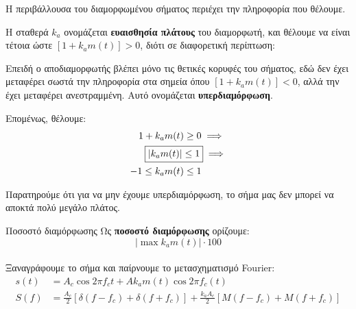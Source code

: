 \documentclass[11pt,a4paper,notitlepage,fleqn,final]{article}
\begin{document}
Η περιβάλλουσα του διαμορφωμένου σήματος περιέχει την πληροφορία που θέλουμε.

Η σταθερά \( k_a \) ονομάζεται \textbf{ευαισθησία πλάτους} του διαμορφωτή, και θέλουμε
να είναι τέτοια ώστε \( \left[1 + k_a m(t)\right] > 0 \), διότι σε διαφορετική περίπτωση:


Επειδή ο αποδιαμορφωτής βλέπει μόνο τις θετικές κορυφές του σήματος, εδώ δεν έχει μεταφέρει
σωστά την πληροφορία στα σημεία όπου \(  \left[1 + k_a m(t)\right] < 0  \), αλλά την έχει
μεταφέρει ανεστραμμένη. Αυτό ονομάζεται \textbf{υπερδιαμόρφωση}.

Επομένως, θέλουμε:
\begin{align*}
	1+ k_a m(t) &\geq 0 \implies \\
	\Aboxed{\left\lvert k_a m(t) \right\rvert &\leq 1} \implies \\
	-1 \leq k_a m(t) &\leq 1
\end{align*}

Παρατηρούμε ότι για να μην έχουμε υπερδιαμόρφωση, το σήμα μας δεν μπορεί να αποκτά πολύ
μεγάλο πλάτος.

\begin{defn}{Ποσοστό διαμόρφωσης}{}
	Ως \textbf{ποσοστό διαμόρφωσης} ορίζουμε:
	\[
	\left\lvert
	\max k_a m(t)
	\right\rvert \cdot 100
	\]
\end{defn}

\paragraph{}
Ξαναγράφουμε το σήμα και παίρνουμε το μετασχηματισμό Fourier:
\begin{align*}
	s(t) &= A_c \cos 2\pi f_c t + Ak_a m(t) \cos 2\pi f_c (t) \\
	S(f) &=
	\frac{A_c}{2}\left[ δ(f-f_c)+δ(f+f_c) \right]
	+ \frac{k_aA_c}{2}\left[ M(f-f_c) + M(f+f_c) \right]
\end{align*}
\end{document}
